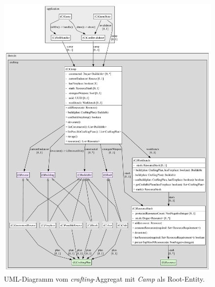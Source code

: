 \begin{figure}[H]
	\centering
	\includegraphics[width=1.05\textwidth]{Bilder/Camp_entity_structure.pdf} 
	\caption{UML-Diagramm vom \textit{crafting}-Aggregat mit \textit{Camp} als Root-Entity.}
	\label{fig:aggregate}
\end{figure} 

